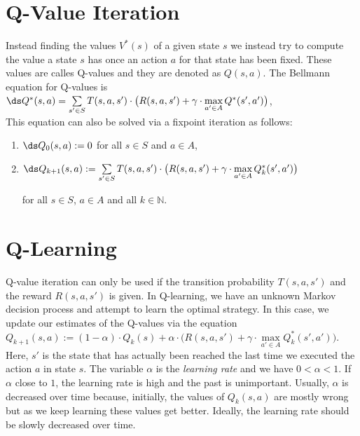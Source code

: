 \section{Q-Value Iteration}
Instead finding the values $V^*(s)$ of a given state $s$ we instead try to compute the value a state
$s$ has once an action $a$ for that state has been fixed.  These values are calles Q-values and they
are denoted as $Q(s,a)$.  The Bellmann equation for Q-values is
\\[0.2cm]
\hspace*{1.3cm}
$\ds Q^*(s,a) = \sum\limits_{s' \in S} T(s,a,s') \cdot \bigl(R(s,a,s') + \gamma \cdot \max\limits_{a' \in A} Q^*(s',a')\bigr)$,
\\[0.2cm]
This equation can also be solved via a fixpoint iteration as follows:
\begin{enumerate}
\item $\ds Q_0(s,a) := 0$ for all $s \in S$ and $a \in A$,
\item $\ds Q_{k+1}(s,a) := \sum\limits_{s' \in S} T(s,a,s') \cdot \bigl(R(s,a,s') + \gamma \cdot \max\limits_{a' \in A} Q_k^*(s',a')\bigr)$ 

      for all $s \in S$, $a \in A$ and all $k \in \mathbb{N}$.
\end{enumerate}

\section{Q-Learning}
Q-value iteration can only be used if the transition probability $T(s,a,s')$ and the reward
$R(s,a,s')$ is given.  In Q-learning, we have an unknown Markov decision process and attempt to
learn the optimal strategy.  In this case, we update our estimates of the Q-values via the equation 
\\[0.2cm]
\hspace*{1.3cm}
$Q_{k+1}(s,a) := (1-\alpha) \cdot Q_{k}(s) + \alpha \cdot \bigl(R(s,a,s') + \gamma \cdot \max\limits_{a' \in A} Q_k^*(s',a')\bigr)$. 
\\[0.2cm]
Here, $s'$ is the state that has actually been reached the last time we executed the action $a$ in
state $s$.  The variable $\alpha$ is the \emph{learning rate} and we have $0 < \alpha < 1$.  If
$\alpha$ close to $1$, the learning rate is high and the past is unimportant.  Usually, $\alpha$ is
decreased over time because, initially, the values of $Q_k(s,a)$ are mostly wrong but as we keep
learning these values get better.  Ideally, the learning rate should be slowly decreased over time.

